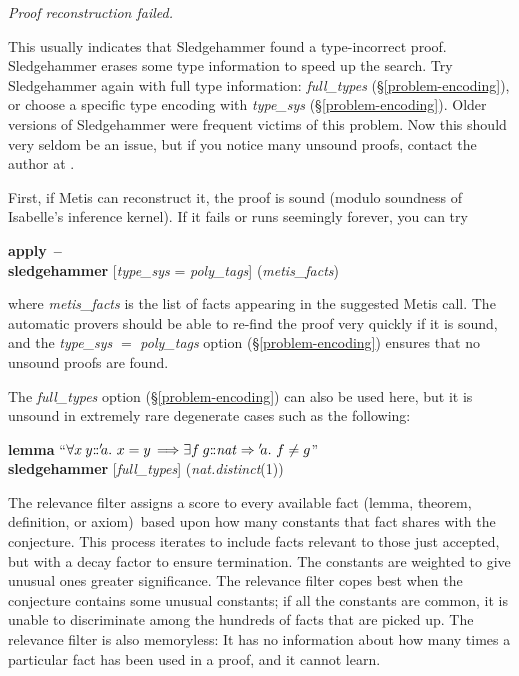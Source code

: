 \documentclass[a4paper,12pt]{article}
\def\Colon{\mathord{:\mkern-1.5mu:}}
\begin{document}
\prew
\slshape
Proof reconstruction failed.
\postw

This usually indicates that Sledgehammer found a type-incorrect proof.
Sledgehammer erases some type information to speed up the search. Try
Sledgehammer again with full type information: \textit{full\_types}
(\S\ref{problem-encoding}), or choose a specific type encoding with
\textit{type\_sys} (\S\ref{problem-encoding}). Older versions of Sledgehammer
were frequent victims of this problem. Now this should very seldom be an issue,
but if you notice many unsound proofs, contact the author at \authoremail.


First, if Metis can reconstruct it, the proof is sound (modulo soundness of
Isabelle's inference kernel). If it fails or runs seemingly forever, you can try

\prew
\textbf{apply}~\textbf{--} \\
\textbf{sledgehammer} [\textit{type\_sys} = \textit{poly\_tags}] (\textit{metis\_facts})
\postw

where \textit{metis\_facts} is the list of facts appearing in the suggested
Metis call. The automatic provers should be able to re-find the proof very
quickly if it is sound, and the \textit{type\_sys} $=$ \textit{poly\_tags}
option (\S\ref{problem-encoding}) ensures that no unsound proofs are found.

The \textit{full\_types} option (\S\ref{problem-encoding}) can also be used
here, but it is unsound in extremely rare degenerate cases such as the
following:

\prew
\textbf{lemma} ``$\forall x\> y\Colon{'}\!a.\ x = y \,\Longrightarrow \exists f\> g\Colon\mathit{nat} \Rightarrow {'}\!a.\ f \not= g$'' \\
\textbf{sledgehammer} [\textit{full\_types}] (\textit{nat.distinct\/}(1))
\postw


The relevance filter assigns a score to every available fact (lemma, theorem,
definition, or axiom)\ based upon how many constants that fact shares with the
conjecture. This process iterates to include facts relevant to those just
accepted, but with a decay factor to ensure termination. The constants are
weighted to give unusual ones greater significance. The relevance filter copes
best when the conjecture contains some unusual constants; if all the constants
are common, it is unable to discriminate among the hundreds of facts that are
picked up. The relevance filter is also memoryless: It has no information about
how many times a particular fact has been used in a proof, and it cannot learn.
\end{document}
